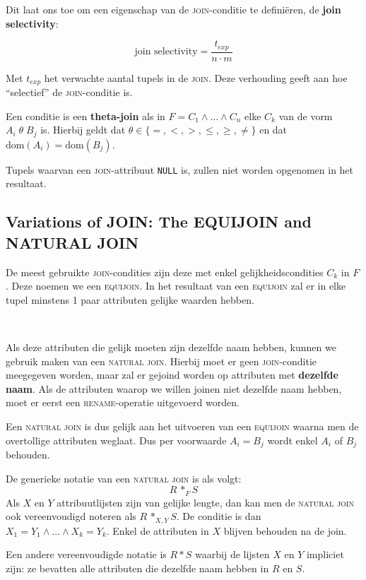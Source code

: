Dit laat ons toe om een eigenschap van de \textsc{join}-conditie te defini\"eren, de \textbf{join selectivity}:

\[ \text{join selectivity} = \frac{t_{exp}}{n \cdot m} \]

Met $t_{exp}$ het verwachte aantal tupels in de \textsc{join}. Deze verhouding geeft aan hoe ``selectief'' de \textsc{join}-conditie is.

Een conditie is een \textbf{theta-join} als in $F = C_1 \wedge \dots \wedge C_n$ elke $C_k$ van de vorm $A_i \; \theta \; B_j$ is. Hierbij geldt dat $\theta \in \{=, <, >, \leqslant, \geqslant, \neq \}$ en dat $\text{dom}(A_i) = \text{dom}(B_j)$.

Tupels waarvan een \textsc{join}-attribuut \texttt{NULL} is, zullen niet worden opgenomen in het resultaat.


\subsection{Variations of JOIN: The EQUIJOIN and NATURAL JOIN}
De meest gebruikte \textsc{join}-condities zijn deze met enkel gelijkheidscondities $C_k$ in $F$. Deze noemen we een \textsc{equijoin}. In het resultaat van een \textsc{equijoin} zal er in elke tupel minstens 1 paar attributen gelijke waarden hebben.

~

\noindent Als deze attributen die gelijk moeten zijn dezelfde naam hebben, kunnen we gebruik maken van een \textsc{natural join}. Hierbij moet er geen \textsc{join}-conditie meegegeven worden, maar zal er gejoind worden op attributen met \textbf{dezelfde naam}. Als de attributen waarop we willen joinen niet dezelfde naam hebben, moet er eerst een \textsc{rename}-operatie uitgevoerd worden.

Een \textsc{natural join} is dus gelijk aan het uitvoeren van een \textsc{equijoin} waarna men de overtollige attributen weglaat. Dus per voorwaarde $A_i = B_j$ wordt enkel $A_i$ of $B_j$ behouden.

De generieke notatie van een \textsc{natural join} is als volgt:
\vspace{-2mm}
\[ R \,*_F S \]
Als $X$ en $Y$ attribuutlijsten zijn van gelijke lengte, dan kan men de \textsc{natural join} ook vereenvoudigd noteren als $R \,*_{X,Y} S$. De conditie is dan $X_1 = Y_1 \wedge \dots \wedge X_k = Y_k$. Enkel de attributen in $X$ blijven behouden na de join.

Een andere vereenvoudigde notatie is $R * S$ waarbij de lijsten $X$ en $Y$ impliciet zijn: ze bevatten alle attributen die dezelfde naam hebben in $R$ en $S$.

